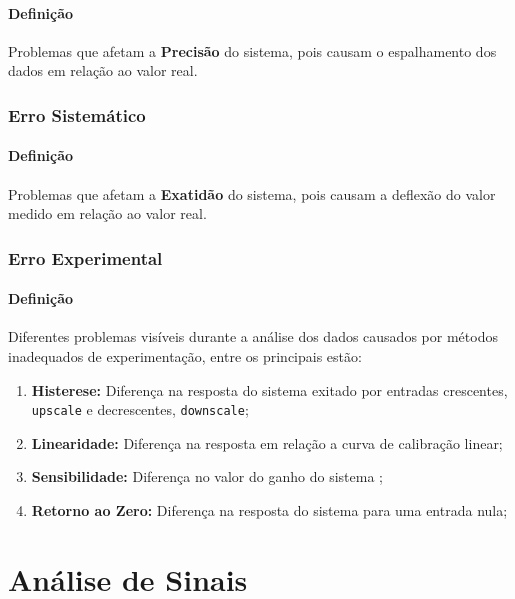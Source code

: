 \documentclass{article}
\begin{document}
            \paragraph{Definição}Problemas que afetam a \textbf{Precisão} do sistema, pois causam o espalhamento dos dados em relação ao valor real.

        \subsubsection{Erro Sistemático}
            \paragraph{Definição}Problemas que afetam a \textbf{Exatidão} do sistema, pois causam a deflexão do valor medido em relação ao valor real.

        \subsubsection{Erro Experimental}
            \paragraph{Definição}Diferentes problemas visíveis durante a análise dos dados causados por métodos inadequados de experimentação, entre os principais estão:
                \begin{enumerate}[rightmargin = \leftmargin]
                    \item \textbf{Histerese:} Diferença na resposta do sistema exitado por entradas crescentes, \texttt{upscale} e decrescentes, \texttt{downscale};

                    \item \textbf{Linearidade:} Diferença na resposta em relação a curva de calibração linear;

                    \item \textbf{Sensibilidade:} Diferença no valor do ganho do sistema ;

                    \item \textbf{Retorno ao Zero:} Diferença na resposta do sistema para uma entrada nula;
                \end{enumerate}

    \section{Análise de Sinais}
\end{document}
